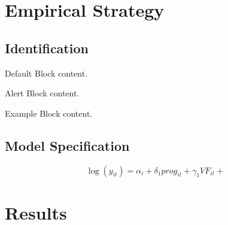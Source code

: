 \documentclass[
11pt,notheorems,compress,hyperref={pdfauthor=Maghfira Ramadhani}
]{beamer}
\begin{document}
\section{Empirical Strategy}
\subsection{Identification}
\begin{frame}

   \centering
	\begin{minipage}[b]{0.5\textwidth}

	  \begin{block}{Default}
        Block content.
      \end{block}

      \begin{alertblock}{Alert}
        Block content.
      \end{alertblock}

      \begin{exampleblock}{Example}
        Block content.
      \end{exampleblock}      
      
	\end{minipage}	
\end{frame}

\subsection{Model Specification}
\begin{frame}
    \begin{equation*}
        \log(y_{it})=\alpha_i+\delta_1 prog_{it}+\gamma_1 VF_{it}+
    \end{equation*}
\end{frame}


\section{Results}
\end{document}
